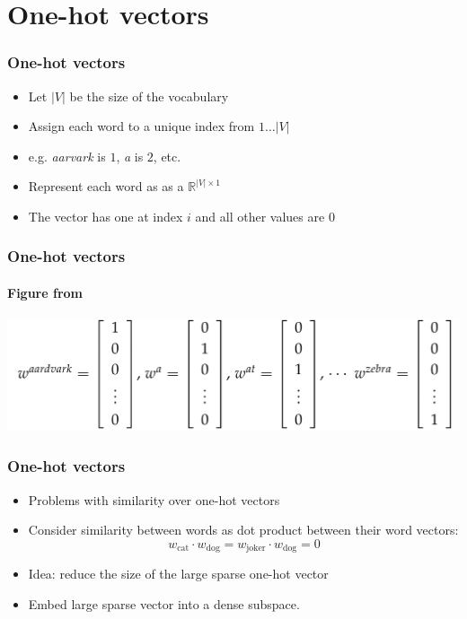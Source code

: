 




\section{One-hot vectors}
\frame{\tableofcontents[currentsection]}

\begin{frame}
\frametitle{One-hot vectors}
\begin{itemize}[<+->]
\item Let $|V|$ be the size of the vocabulary
\item Assign each word to a unique index from $1 \ldots |V|$
\item e.g. {\em aarvark} is $1$, {\em a} is $2$, etc.
\item Represent each word as as a $\mathbb{R}^{|V|\times 1}$
\item The vector has one at index $i$ and all other values are $0$
\end{itemize}
\end{frame}

\begin{frame}
\frametitle{One-hot vectors}
\framesubtitle{Figure from \cite{cs224n}}
\begin{center}
\includegraphics[scale=.45]{figures/wordvectors/onehot}	
\end{center}
\end{frame}

\begin{frame}
\frametitle{One-hot vectors}
\begin{itemize}[<+->]
\item Problems with similarity over one-hot vectors 
\item Consider similarity between words as dot product between their word vectors:
\[ w_{\textrm{cat}} \cdot w_{\textrm{dog}} = 
w_{\textrm{joker}} \cdot w_{\textrm{dog}} = 
0 \]
\item Idea: reduce the size of the large sparse one-hot vector
\item Embed large sparse vector into a dense subspace.
\end{itemize}
\end{frame}

